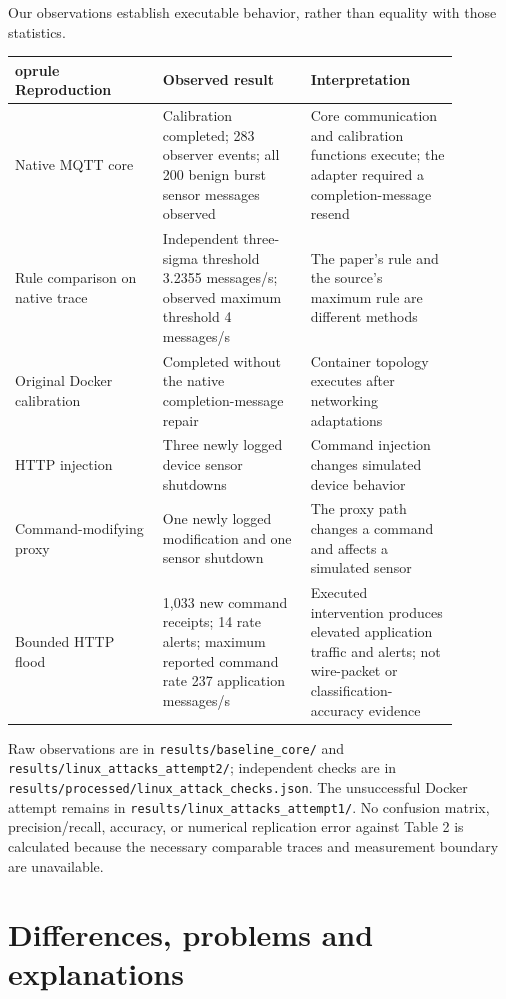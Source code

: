 \documentclass[11pt,a4paper]{article}
\begin{document}
Our observations establish executable behavior, rather than equality with those statistics.


\begingroup\small\setlength{\tabcolsep}{3pt}\begin{longtable}{p{0.29333333333333333\linewidth}p{0.29333333333333333\linewidth}p{0.29333333333333333\linewidth}}	oprule
Reproduction & Observed result & Interpretation \\
\midrule\endhead
Native MQTT core & Calibration completed; 283 observer events; all 200 benign burst sensor messages observed & Core communication and calibration functions execute; the adapter required a completion-message resend \\
Rule comparison on native trace & Independent three-sigma threshold 3.2355 messages/s; observed maximum threshold 4 messages/s & The paper's rule and the source's maximum rule are different methods \\
Original Docker calibration & Completed without the native completion-message repair & Container topology executes after networking adaptations \\
HTTP injection & Three newly logged device sensor shutdowns & Command injection changes simulated device behavior \\
Command-modifying proxy & One newly logged modification and one sensor shutdown & The proxy path changes a command and affects a simulated sensor \\
Bounded HTTP flood & 1,033 new command receipts; 14 rate alerts; maximum reported command rate 237 application messages/s & Executed intervention produces elevated application traffic and alerts; not wire-packet or classification-accuracy evidence \\
\bottomrule\end{longtable}\endgroup

Raw observations are in \texttt{results/baseline\_core/} and \texttt{results/linux\_attacks\_attempt2/}; independent checks are in \texttt{results/processed/linux\_attack\_checks.json}. The unsuccessful Docker attempt remains in \texttt{results/linux\_attacks\_attempt1/}. No confusion matrix, precision/recall, accuracy, or numerical replication error against Table 2 is calculated because the necessary comparable traces and measurement boundary are unavailable.


\section{Differences, problems and explanations}
\end{document}
